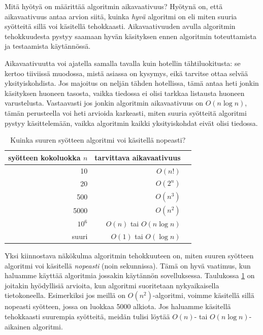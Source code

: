 Mitä hyötyä on määrittää algoritmin aikavaativuus?
Hyötynä on, että aikavaativuus antaa arvion siitä,
kuinka \emph{hyvä} algoritmi on eli miten suuria syötteitä
sillä voi käsitellä tehokkaasti.
Aikavaativuuden avulla algoritmin tehokkuudesta pystyy saamaan
hyvän käsityksen ennen algoritmin toteuttamista ja testaamista käytännössä.

Aikavaativuutta voi ajatella samalla tavalla kuin
hotellin tähti\-luokitusta: se kertoo tiiviissä muodossa,
mistä asiassa on kysymys, eikä tarvitse ottaa selvää yksityiskohdista.
Jos majoitus on neljän tähden hotellissa,
tämä antaa heti jonkin käsityksen huoneen tasosta,
vaikka tiedossa ei olisi tarkkaa listausta huoneen varustelusta.
Vastaavasti jos jonkin algoritmin aikavaativuus on $O(n \log n)$,
tämän perusteella voi heti arvioida karkeasti,
miten suuria syötteitä algoritmi pystyy käsittelemään,
vaikka algoritmin kaikki yksityiskohdat eivät olisi tiedossa.

\begin{table}
    \center
    \begin{tabular}{rrr}
        syötteen kokoluokka $n$ & tarvittava aikavaativuus \\
        \hline
        10                      & $O(n!)$                  \\
        20                      & $O(2^n)$                 \\
        500                     & $O(n^3)$                 \\
        5000                    & $O(n^2)$                 \\
        $10^6$                  & $O(n)$ tai $O(n \log n)$ \\
        suuri                   & $O(1)$ tai $O(\log n)$   \\
    \end{tabular}
    \caption{Kuinka suuren syötteen algoritmi voi käsitellä nopeasti?}
    \label{tab:algteh}
\end{table}

Yksi kiinnostava näkökulma algoritmin tehokkuuteen on,
miten suuren syötteen algoritmi voi käsitellä \emph{nopeasti}
(noin sekunnissa).
Tämä on hyvä vaatimus, kun haluamme käyttää algoritmia
jossakin käytännön sovelluksessa.
Taulukossa \ref{tab:algteh} on joitakin hyödyllisiä arvioita,
kun algoritmi suoritetaan nykyaikaisella tietokoneella.
Esimerkiksi jos meillä on $O(n^2)$-algoritmi, voimme käsitellä sillä
nopeasti syötteen, jossa on luokkaa 5000 alkiota.
Jos haluamme käsitellä tehokkaasti suurempia syötteitä,
meidän tulisi löytää $O(n)$- tai $O(n \log n)$-aikainen algoritmi.

